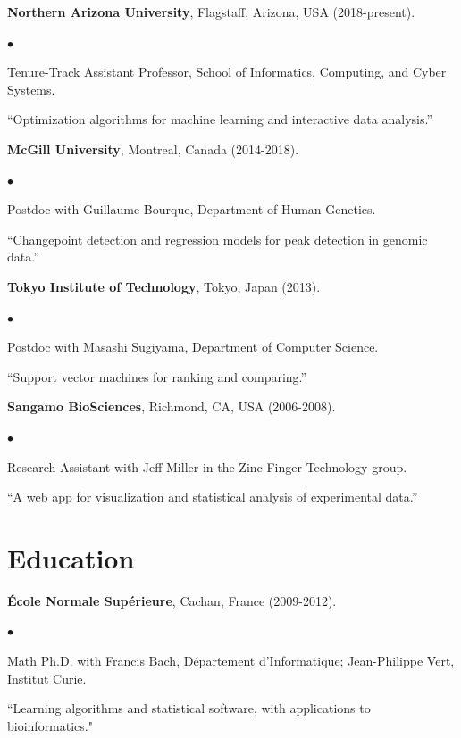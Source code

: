 \documentclass[margin,line]{res}
\newenvironment{list2}{
  \begin{list}{$\bullet$}{%
      \setlength{\itemsep}{0in}
      \setlength{\parsep}{0in} \setlength{\parskip}{0in}
      \setlength{\topsep}{0in} \setlength{\partopsep}{0in} 
      \setlength{\leftmargin}{0.2in}}}{\end{list}}
\begin{document}
\begin{resume}
{\bf Northern Arizona University}, Flagstaff, Arizona, USA (2018-present).\\
\vspace*{-.1in}
\begin{list2}
\item[] Tenure-Track Assistant Professor, School of Informatics, Computing, and Cyber Systems.
\item[] ``Optimization algorithms for machine learning and interactive data analysis.''
\end{list2}

{\bf McGill University}, Montreal, Canada (2014-2018).\\
\vspace*{-.1in}
\begin{list2}
\item[] Postdoc with Guillaume Bourque, Department of Human Genetics.
\item[]``Changepoint detection and regression models for peak detection in genomic data.''
\end{list2}

{\bf Tokyo Institute of Technology}, Tokyo, Japan (2013).\\
\vspace*{-.1in}
\begin{list2}
\item[] Postdoc with Masashi Sugiyama, Department of Computer Science.
\item[] ``Support vector machines for ranking and comparing.''
\end{list2}

{\bf Sangamo BioSciences}, Richmond, CA, USA (2006-2008).\\
\vspace*{-.1in}
\begin{list2}
\item[] Research Assistant with Jeff Miller in the Zinc Finger Technology group.
\item[] ``A web app for visualization and statistical analysis of experimental data.''
\end{list2}

\section{\sc Education}

{\bf \'{E}cole Normale Sup\'{e}rieure}, Cachan, France (2009-2012).\\
\vspace*{-.1in}
\begin{list2}
\item[] Math Ph.D. with Francis Bach, D\'{e}partement d'Informatique; Jean-Philippe Vert, Institut Curie.
\item[] ``Learning algorithms and statistical software, with applications to bioinformatics."
\end{list2}


\end{resume}
\end{document}
